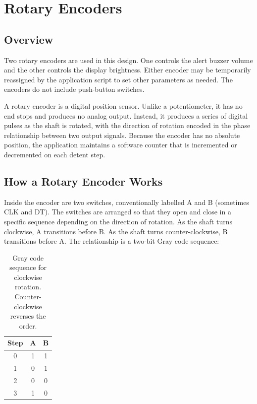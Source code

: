 \section{Rotary Encoders}

\subsection{Overview}

Two rotary encoders are used in this design. One controls the alert buzzer volume and
the other controls the display brightness. Either encoder may be temporarily
reassigned by the application script to set other parameters as needed. The encoders
do not include push-button switches.

A rotary encoder is a digital position sensor. Unlike a potentiometer, it has no
end stops and produces no analog output. Instead, it produces a series of digital
pulses as the shaft is rotated, with the direction of rotation encoded in the phase
relationship between two output signals. Because the encoder has no absolute position,
the application maintains a software counter that is incremented or decremented on
each detent step.

\subsection{How a Rotary Encoder Works}

Inside the encoder are two switches, conventionally labelled A and B (sometimes CLK
and DT). The switches are arranged so that they open and close in a specific sequence
depending on the direction of rotation. As the shaft turns clockwise, A transitions
before B. As the shaft turns counter-clockwise, B transitions before A. The
relationship is a two-bit Gray code sequence:

\begin{table}[h]
\centering
\begin{tabular}{ccc}
\hline
\textbf{Step} & \textbf{A} & \textbf{B} \\
\hline
0 & 1 & 1 \\
1 & 0 & 1 \\
2 & 0 & 0 \\
3 & 1 & 0 \\
\hline
\end{tabular}
\caption{Gray code sequence for clockwise rotation. Counter-clockwise reverses the order.}
\label{tab:encoder_gray}
\end{table}

